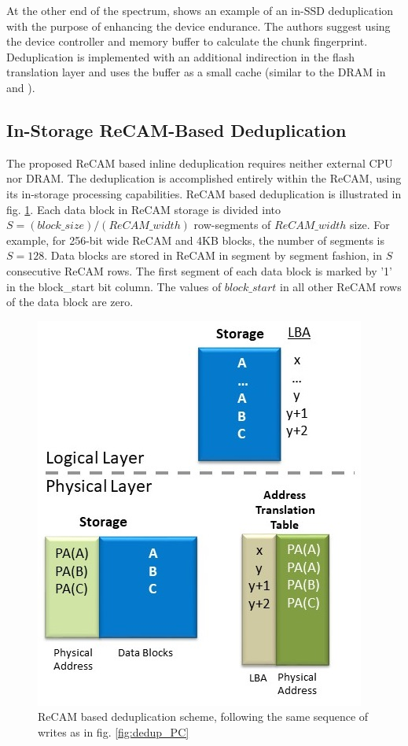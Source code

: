 \documentclass{superfri}
\begin{document}
	At the other end of the spectrum, \cite{chen2011caftl} shows an example of an in-SSD deduplication with the purpose of enhancing the device endurance. The authors suggest using the device controller and memory buffer to calculate the chunk fingerprint. Deduplication is implemented with an additional indirection in the flash translation layer and uses the buffer as a small cache (similar to the DRAM in \cite{debnath2010chunkstash} and \cite{zhu2008avoiding}). 
	
	
	\subsection{In-Storage ReCAM-Based Deduplication}
	
	
	The proposed ReCAM based inline deduplication requires neither external CPU nor DRAM. The deduplication is accomplished entirely within the ReCAM, using its in-storage processing capabilities. ReCAM based deduplication is illustrated in fig. \ref{fig:dedup_ReCAM}. Each data block in ReCAM storage is divided into $S=(block\_size)/(ReCAM\_width)$ row-segments of $ReCAM\_width$ size. For example, for 256-bit wide ReCAM and 4KB blocks, the number of segments is $S=128$. Data blocks are stored in ReCAM in segment by segment fashion, in $S$ consecutive ReCAM rows. The first segment of each data block is marked by '1' in the block\_start bit column. The values of $block\_start$ in all other ReCAM rows of the data block are zero. 
	
	\begin{figure}[ht!]
		\centerline{\includegraphics[scale=0.5]{Figures/dedup_ReCAM.jpg}}
		\caption{ReCAM based deduplication scheme, following the same sequence of writes as in fig. \ref{fig:dedup_PC}}
		\label{fig:dedup_ReCAM}
	\end{figure}
	
\end{document}
